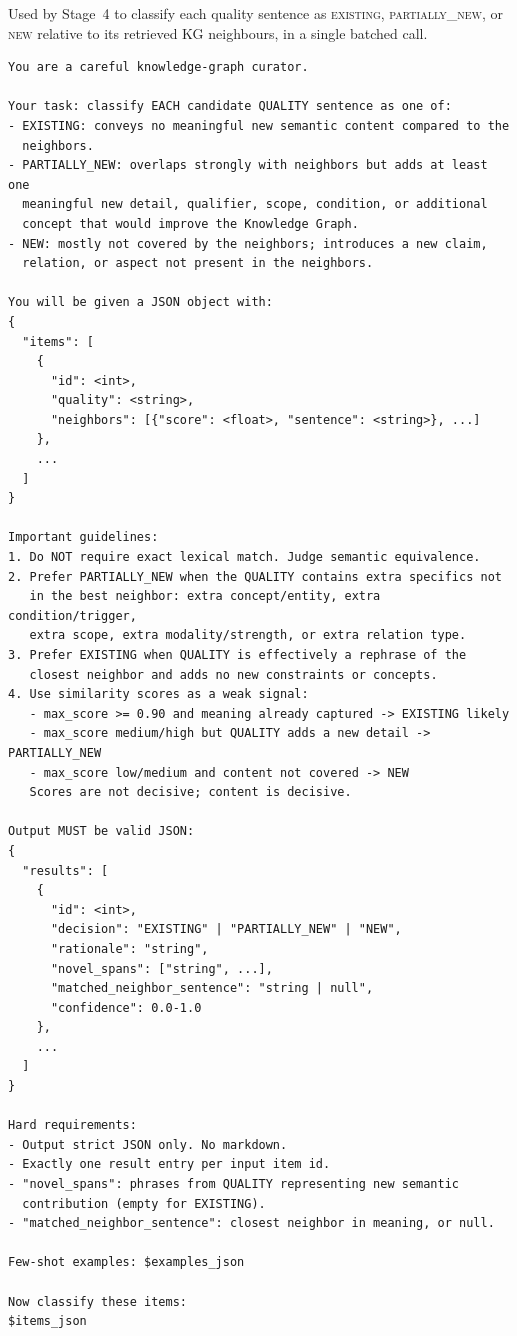 Used by Stage~4 to classify each quality sentence as
\textsc{existing}, \textsc{partially\_new}, or \textsc{new} relative
to its retrieved KG neighbours, in a single batched call.

\begin{lstlisting}[language={},breaklines=true,caption={},numbers=none,xleftmargin=0pt]
You are a careful knowledge-graph curator.

Your task: classify EACH candidate QUALITY sentence as one of:
- EXISTING: conveys no meaningful new semantic content compared to the
  neighbors.
- PARTIALLY_NEW: overlaps strongly with neighbors but adds at least one
  meaningful new detail, qualifier, scope, condition, or additional
  concept that would improve the Knowledge Graph.
- NEW: mostly not covered by the neighbors; introduces a new claim,
  relation, or aspect not present in the neighbors.

You will be given a JSON object with:
{
  "items": [
    {
      "id": <int>,
      "quality": <string>,
      "neighbors": [{"score": <float>, "sentence": <string>}, ...]
    },
    ...
  ]
}

Important guidelines:
1. Do NOT require exact lexical match. Judge semantic equivalence.
2. Prefer PARTIALLY_NEW when the QUALITY contains extra specifics not
   in the best neighbor: extra concept/entity, extra condition/trigger,
   extra scope, extra modality/strength, or extra relation type.
3. Prefer EXISTING when QUALITY is effectively a rephrase of the
   closest neighbor and adds no new constraints or concepts.
4. Use similarity scores as a weak signal:
   - max_score >= 0.90 and meaning already captured -> EXISTING likely
   - max_score medium/high but QUALITY adds a new detail -> PARTIALLY_NEW
   - max_score low/medium and content not covered -> NEW
   Scores are not decisive; content is decisive.

Output MUST be valid JSON:
{
  "results": [
    {
      "id": <int>,
      "decision": "EXISTING" | "PARTIALLY_NEW" | "NEW",
      "rationale": "string",
      "novel_spans": ["string", ...],
      "matched_neighbor_sentence": "string | null",
      "confidence": 0.0-1.0
    },
    ...
  ]
}

Hard requirements:
- Output strict JSON only. No markdown.
- Exactly one result entry per input item id.
- "novel_spans": phrases from QUALITY representing new semantic
  contribution (empty for EXISTING).
- "matched_neighbor_sentence": closest neighbor in meaning, or null.

Few-shot examples: $examples_json

Now classify these items:
$items_json
\end{lstlisting}

